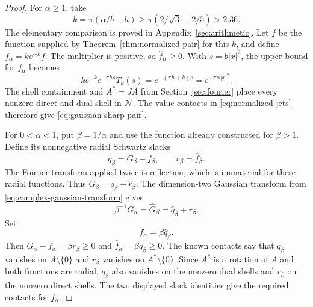 \begin{proof}
For $\alpha\ge1$, take
\[
 k=\pi(\alpha/b-h)\ge\pi(2/\sqrt3-2/5)>2.36.
\]
The elementary comparison is proved in Appendix~\ref{sec:arithmetic}.
Let $f$ be the function supplied by Theorem~\ref{thm:normalized-pair}
for this $k$, and define $f_\alpha=ke^{-k}f$.  The multiplier is positive,
so $\widehat f_\alpha\ge0$.  With $s=b|x|^2$, the upper bound for
$f_\alpha$ becomes
\[
 ke^{-k}e^{-\pi hs}T_k(s)
 =e^{-(\pi h+k)s}=e^{-\pi\alpha|x|^2}.
\]
The shell containment and $A^*=JA$ from Section~\ref{sec:fourier} place every
nonzero direct and dual shell in $\mathcal N$.  The value contacts in
\eqref{eq:normalized-jets} therefore give \eqref{eq:gaussian-sharp-pair}.

For $0<\alpha<1$, put $\beta=1/\alpha$ and use the function already
constructed for $\beta>1$.  Define its nonnegative radial Schwartz slacks
\[
 q_\beta=G_\beta-f_\beta,\qquad r_\beta=\widehat f_\beta.
\]
The Fourier transform applied twice is reflection, which is immaterial for
these radial functions.  Thus $G_\beta=q_\beta+\widehat r_\beta$.
The dimension-two Gaussian transform from
\eqref{eq:complex-gaussian-transform} gives
\[
 \beta^{-1}G_\alpha=\widehat G_\beta
 =\widehat q_\beta+r_\beta.
\]
Set
\begin{equation}\label{eq:reciprocal-minorant}
 f_\alpha=\beta\widehat q_\beta.
\end{equation}
Then $G_\alpha-f_\alpha=\beta r_\beta\ge0$ and
$\widehat f_\alpha=\beta q_\beta\ge0$.  The known contacts say that
$q_\beta$ vanishes on $A\setminus\{0\}$ and $r_\beta$ vanishes on
$A^*\setminus\{0\}$.  Since $A^*$ is a rotation of $A$ and both functions
are radial, $q_\beta$ also vanishes on the nonzero dual shells and
$r_\beta$ on the nonzero direct shells.  The two displayed slack identities
give the required contacts for $f_\alpha$.
\end{proof}

